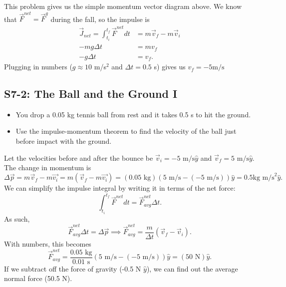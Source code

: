 \documentclass[]{article}
\begin{document}
\newpage
\begin{TeacherMargin}
\begin{center}
\end{center}
This problem gives us the simple momentum vector diagram above. We know that $\vec{F}^{net} =\vec{F}^{g}$ during the fall, so the impulse is
\begin{align*}
	\vec{J}_{net} = \int_{t_{i}}^{t_{f}}\vec{F}^{net}dt & = m\vec{v}_{f} - m\vec{v}_{i} \\
	-mg\Delta t & = mv_{f} \\
	-g\Delta t & = v_{f}.
\end{align*}
Plugging in numbers ($g\approx 10$ m/s$^{2}$ and $\Delta t = 0.5$ s) gives us $v_{f} = -5\text{m}/\text{s}$
\end{TeacherMargin}
\begin{PresentSpace}
\vspace{-10pt}
\section*{S7-2: The Ball and the Ground I}
\vspace{-10pt}
\begin{itemize}
	\item You drop a 0.05 kg tennis ball from rest and it takes 0.5 s to hit the ground.
	\item Use the impulse-momentum theorem to find the velocity of the ball just before impact with the ground.
\end{itemize}
\end{PresentSpace}
\newpage
\begin{TeacherMargin}
\begin{center}
\end{center}
Let the velocities before and after the bounce be $\vec{v}_{i} = -5\text{ m}/\text{s}\hat{y}$ and $\vec{v}_{f} = 5\text{ m}/\text{s}\hat{y}$. The change in momentum is
\[
\Delta\vec{p} = m\vec{v}_{f} - m\vec{v_{i}} = m \left(\vec{v}_{f} - m\vec{v_{i}}\right) = (0.05\text{ kg})(5\text{ m}/\text{s} - (-5\text{ m}/\text{s}))\hat{y} = 0.5 \text{kg m/s}^{2}\hat{y}.
\]
We can simplify the impulse integral by writing it in terms of the net force:
\[
\int_{t_{i}}^{t_{f}}\vec{F}^{net}dt = \vec{F}^{net}_{avg}\Delta t.
\]
As such,
\[
\vec{F}^{net}_{avg}\Delta t = \Delta\vec{p} \implies \vec{F}^{net}_{avg} = \frac{m}{\Delta t}\left(\vec{v}_{f}-\vec{v}_{i}\right).
\]
With numbers, this becomes
\[
\vec{F}^{net}_{avg} = \frac{0.05\text{ kg}}{0.01\text{ s}}\left(5\text{ m}/\text{s}-(-5\text{ m}/\text{s})\right)\hat{y} = (50\text{ N})\hat{y}.
\]
If we subtract off the force of gravity (-0.5 N $\hat{y}$), we can find out the average normal force (50.5 N).
\end{TeacherMargin}
\end{document}
